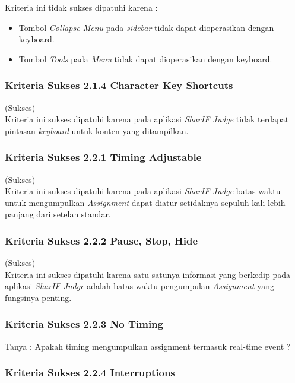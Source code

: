 Kriteria ini tidak sukses dipatuhi karena :
\begin{itemize}
	\item Tombol \textit{Collapse Menu} pada \textit{sidebar} tidak dapat dioperasikan dengan keyboard.
	\item Tombol \textit{Tools} pada \textit{Menu} tidak dapat dioperasikan dengan keyboard.
\end{itemize}

\subsubsection{Kriteria Sukses 2.1.4 Character Key Shortcuts}
\label{subsubsec:kepatuhan_kriteria_2.1.4}
(Sukses) \\

Kriteria ini sukses dipatuhi karena pada aplikasi \textit{SharIF Judge} tidak terdapat pintasan \textit{keyboard} untuk konten yang ditampilkan.

\subsubsection{Kriteria Sukses 2.2.1 Timing Adjustable}
\label{subsubsec:kepatuhan_kriteria_2.2.1}
(Sukses) \\

Kriteria ini sukses dipatuhi karena pada aplikasi \textit{SharIF Judge} batas waktu untuk mengumpulkan \textit{Assignment} dapat diatur setidaknya sepuluh kali lebih panjang dari setelan standar.

\subsubsection{Kriteria Sukses 2.2.2 Pause, Stop, Hide}
\label{subsubsec:kepatuhan_kriteria_2.2.2}
(Sukses) \\

Kriteria ini sukses dipatuhi karena satu-satunya informasi yang berkedip pada aplikasi \textit{SharIF Judge} adalah batas waktu pengumpulan \textit{Assignment} yang fungsinya penting.

\subsubsection{Kriteria Sukses 2.2.3 No Timing}
\label{subsubsec:kepatuhan_kriteria_2.2.3}

Tanya : Apakah timing mengumpulkan assignment termasuk real-time event ?

\subsubsection{Kriteria Sukses 2.2.4 Interruptions}
\label{subsubsec:kepatuhan_kriteria_2.2.4}

